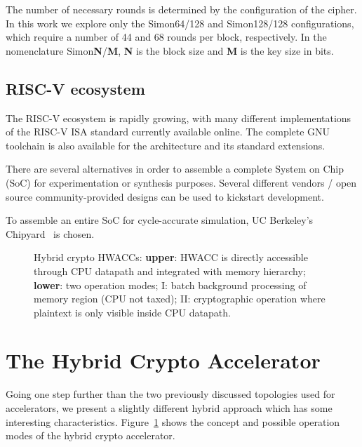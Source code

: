 \documentclass[10pt,conference]{IEEEtran}
\begin{document}
The number of necessary rounds is determined by the configuration of the cipher.
In this work we explore only the Simon64/128 and Simon128/128 configurations,
which require a number of 44 and 68 rounds per block, respectively.
In the nomenclature Simon\textbf{N}/\textbf{M}, \textbf{N} is the block size and
\textbf{M} is the key size in bits.

\subsection{RISC-V ecosystem}

The RISC-V ecosystem is rapidly growing, with many different implementations of
the RISC-V ISA standard currently available online. The complete GNU toolchain
is also available for the architecture and its standard extensions.

There are several alternatives in order to assemble a complete System on Chip
(SoC) for experimentation or synthesis purposes. Several different vendors /
open source community-provided designs can be used to kickstart development.

To assemble an entire SoC for cycle-accurate simulation, UC Berkeley's Chipyard~\cite{Chipyard}
is chosen.

\begin{figure}
  \centering
  \caption{Hybrid crypto HWACCs: \textbf{upper}: HWACC is directly accessible through CPU datapath and
    integrated with memory hierarchy; \textbf{lower}: two operation modes; I: batch
    background processing of memory region (CPU not taxed); II: cryptographic
    operation where plaintext is only visible inside CPU datapath.}
  \label{fig:hybrid}
\end{figure}

\section{The Hybrid Crypto Accelerator}

Going one step further than the two previously discussed topologies used for
accelerators, we present a slightly different hybrid approach which has
some interesting characteristics. Figure~\ref{fig:hybrid} shows the concept and
possible operation modes of the hybrid crypto accelerator.
\end{document}
